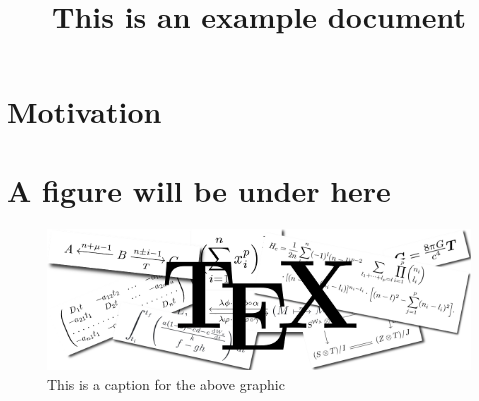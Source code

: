 \documentclass{article}
\begin{document}
\title{This is an example document}
\date{}
\maketitle 

\section{Motivation}

\lipsum[1-1]

\section{A figure will be under here}

\begin{figure}[ht]
\centering
\includegraphics[width=\linewidth]{figures/example_figure.png}
\caption{This is a caption for the above graphic}
\end{figure}
\end{document}
